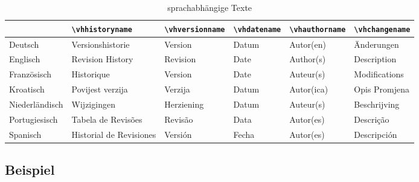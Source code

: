 \begin{table}%
\begin{center}
\begin{scriptsize}
\begin{tabular}{llllll}\hline
& \verb|\vhhistoryname| & \verb|\vhversionname| & \verb|\vhdatename| & \verb|\vhauthorname| & \verb|\vhchangename|\\ \hline
Deutsch & Versionshistorie & Version & Datum & Autor(en) & Änderungen\\
Englisch & Revision History & Revision & Date & Author(s) & Description\\
Französisch & Historique & Version & Date & Auteur(s) & Modifications\\
Kroatisch & Povijest verzija & Verzija & Datum & Autor(ica) & Opis Promjena\\
Niederländisch & Wijzigingen & Herziening & Datum & Auteur(s) & Beschrijving\\
Portugiesisch & Tabela de Revis\~{o}es & Revis\~{a}o & Data & Autor(es) & Descri\c{c}\~{a}o\\
Spanisch & Historial de Revisiones & Versi\'{o}n & Fecha & Autor(es) & Descripci\'{o}n\\ \hline
\end{tabular}
\end{scriptsize}
\caption{sprachabhängige Texte}
\label{tab:sprachen}
\end{center}
\end{table}

\subsection{Beispiel}

